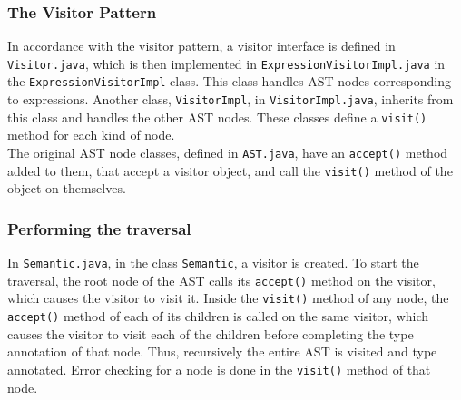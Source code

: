 \documentclass{article}
\begin{document}
\subsubsection*{The Visitor Pattern}
In accordance with the visitor pattern, a visitor interface is defined in \verb|Visitor.java|, which is then implemented in \verb|ExpressionVisitorImpl.java| in the \verb|ExpressionVisitorImpl| class. This class handles AST nodes corresponding to expressions. Another class, \verb|VisitorImpl|, in \verb|VisitorImpl.java|, inherits from this class and handles the other AST nodes. These classes define a \verb|visit()| method for each kind of node.
\\
The original AST node classes, defined in \verb|AST.java|, have an \verb|accept()| method added to them, that accept a visitor object, and call the \verb|visit()| method of the object on themselves.

\subsubsection*{Performing the traversal}
In \verb|Semantic.java|, in the class \verb|Semantic|, a visitor is created. To start the traversal, the root node of the AST calls its \verb|accept()| method on the visitor, which causes the visitor to visit it. Inside the \verb|visit()| method of any node, the \verb|accept()| method of each of its children is called on the same visitor, which causes the visitor to visit each of the children before completing the type annotation of that node. Thus, recursively the entire AST is visited and type annotated. Error checking for a node is done in the \verb|visit()| method of that node.
\end{document}
